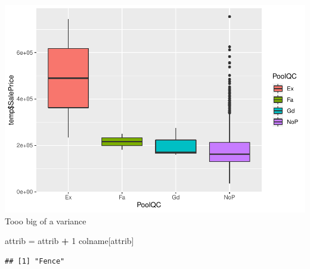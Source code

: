 \documentclass[]{article}
\newenvironment{Shaded}{\begin{snugshade}}{\end{snugshade}}
\newcommand{\DecValTok}[1]{\textcolor[rgb]{0.00,0.00,0.81}{#1}}
\newcommand{\StringTok}[1]{\textcolor[rgb]{0.31,0.60,0.02}{#1}}
\newcommand{\OperatorTok}[1]{\textcolor[rgb]{0.81,0.36,0.00}{\textbf{#1}}}
\newcommand{\NormalTok}[1]{#1}
\begin{document}
\includegraphics{EDA_files/figure-latex/unnamed-chunk-95-1.pdf} Tooo big
of a variance

\begin{Shaded}
\begin{Highlighting}[]
\NormalTok{attrib =}\StringTok{ }\NormalTok{attrib }\OperatorTok{+}\StringTok{ }\DecValTok{1}
\NormalTok{colname[attrib]}
\end{Highlighting}
\end{Shaded}

\begin{verbatim}
## [1] "Fence"
\end{verbatim}
\end{document}
